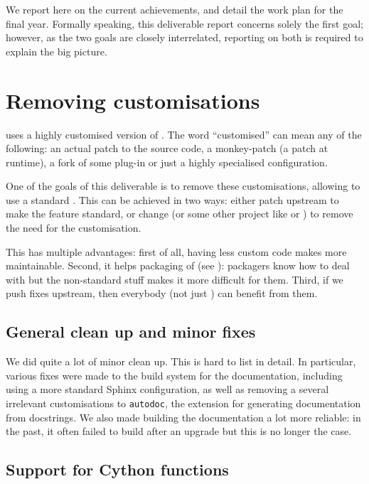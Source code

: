 \documentclass{deliverablereport}
\begin{document}
We report here on the current achievements, and detail the work plan for the
final year. Formally speaking, this deliverable report concerns solely the
first goal; however, as the two goals are closely interrelated, reporting on
both is required to explain the big picture.

\section{Removing \Sage customisations}

\Sage uses a highly customised version of \Sphinx.
The word ``customised'' can mean any of the following:
an actual patch to the source code,
a monkey-patch (a patch at runtime),
a fork of some plug-in or just a highly specialised configuration.

One of the goals of this deliverable is to remove these
customisations, allowing \Sage to use a standard \Sphinx.
This can be achieved in two ways:
either patch upstream \Sphinx to make the feature standard,
or change \Sage (or some other project like \Cython or \Python)
to remove the need for the customisation.

This has multiple advantages:
first of all, having less custom code makes \Sage more maintainable.
Second, it helps packaging of \Sage
(see ):
packagers know how to deal with \Sphinx
but the non-standard \Sage stuff makes it more difficult for them.
Third, if we push fixes upstream, then everybody (not just \Sage)
can benefit from them.

\subsection{General clean up and minor fixes}

We did quite a lot of minor clean up.
This is hard to list in detail.
In particular, various fixes were made to the build system for the documentation,
including using a more standard Sphinx configuration, as well as
removing a several irrelevant customisations to \texttt{autodoc},
the extension for generating documentation from docstrings.
We also made building the \Sage documentation a lot more reliable:
in the past, it often failed to build after an upgrade
but this is no longer the case.

\subsection{Support for Cython functions}\label{cython}
\end{document}
